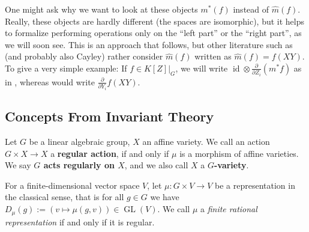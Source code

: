 \begin{remark}
One might ask why we want to look at these objects $ m^\ast \left( f \right) $ instead of $ \hat{m} \left( f \right) $.
Really, these objects are hardly different (the spaces are isomorphic), but it helps to formalize performing operations only on the ``left part'' or the ``right part'', as we will soon see.
This is an approach that \cite{DK15} follows, but other literature such as \cite{Stu08} (and probably also Cayley) rather consider $ \hat{m} \left( f \right) $ written as $ \hat{m} \left( f \right) = f (XY) $.
To give a very simple example:
If $f \in \left. K[Z] \right|_G$, we will write $\operatorname{id} \otimes \frac{\partial}{\partial Z_i} (m^\ast f)$ as in \cite{DK15}, whereas \cite{Stu08} would write $\frac{\partial}{\partial Y_i} f(XY)$.
\end{remark}

\subsection{Concepts From Invariant Theory}

\begin{definition}
  Let $G$ be a linear algebraic group, $X$ an affine variety.
  We call an action $G \times X \longrightarrow X$ a \textbf{regular action}, if and only if $\mu$ is a morphism of affine varieties.
  We say \textbf{$ G $ acts regularly on $ X $}, and we also call $X$ a \textbf{$G$-variety}.

  For a finite-dimensional vector space $V$, let $\mu \colon G \times V \longrightarrow V$ be a representation in the classical sense, that is for all $g \in G$ we have $D_\mu (g) := (v \mapsto \mu(g,v)) \in \operatorname{GL}(V)$.
  We call $\mu$ a \textit{finite rational representation} if and only if it is regular.
  
\end{definition}

